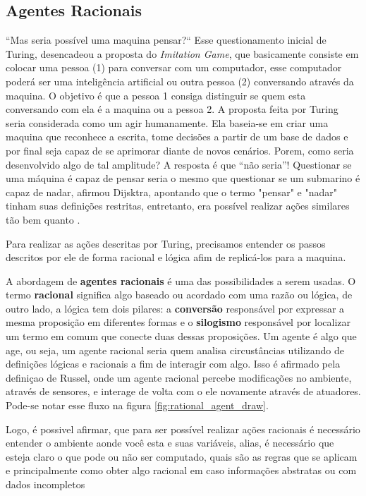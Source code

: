 \subsection{Agentes Racionais}
“Mas seria possível uma maquina pensar?“ Esse questionamento inicial de Turing, desencadeou a proposta do \textit{Imitation Game}, que basicamente consiste em colocar uma pessoa (1) para conversar com um computador, esse computador poderá ser uma inteligência artificial ou outra pessoa (2) conversando através da maquina. O objetivo é que a pessoa 1 consiga distinguir se quem esta conversando com ela é a maquina ou a pessoa 2. A proposta feita por Turing seria considerada como um agir humanamente. Ela baseia-se em criar uma maquina que reconhece a escrita, tome decisões a partir de um base de dados e por final seja capaz de se aprimorar diante de novos cenários. Porem, como seria desenvolvido algo de tal amplitude? A resposta é que “não seria”! Questionar se uma máquina é capaz de pensar seria o mesmo que questionar se um submarino é capaz de nadar, afirmou Dijsktra, apontando que o termo "pensar" e "nadar" tinham suas definições restritas, entretanto, era possível realizar ações similares tão bem quanto \cite[2-3]{dijkstra898, turing1950, russell2003artificial}.

Para realizar as ações descritas por Turing, precisamos entender os passos descritos por ele de forma racional e lógica afim de replicá-los para a maquina.

A abordagem de \textbf{agentes racionais} é uma das possibilidades a serem usadas. O termo \textbf{racional} significa algo baseado ou acordado com uma razão ou lógica, de outro lado, a lógica tem dois pilares: a \textbf{conversão} responsável por expressar a mesma proposição em diferentes formas e o \textbf{silogismo} responsável por localizar um termo em comum que conecte duas dessas proposições. Um agente é algo que age, ou seja, um agente racional seria quem analisa circustâncias utilizando de definições lógicas e racionais a fim de interagir com algo. Isso é afirmado pela definiçao de Russel, onde um agente racional percebe modificações no ambiente, através de sensores, e interage de volta com o ele novamente através de atuadores. Pode-se notar esse fluxo na figura \ref{fig:rational_agent_draw}.

Logo, é possivel afirmar, que para ser possível realizar ações racionais é necessário entender o ambiente aonde você esta e suas variáveis, alias, é necessário que esteja claro o que pode ou não ser computado, quais são as regras que se aplicam e principalmente como obter algo racional em caso informações abstratas ou com dados incompletos \cite[7]{frege1956thought, wooldridge1994agent, simon1955behavioral, boole1854investigation, russell2003artificial}

